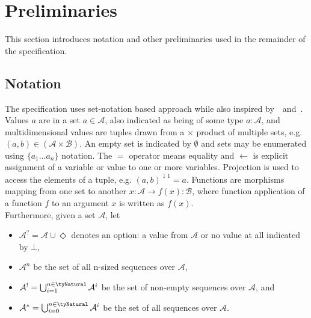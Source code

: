 \clearpage
\section{Preliminaries}\label{sec:prel}

This section introduces notation and other preliminaries used in the remainder
of the specification.

\subsection{Notation}

The specification uses set-notation based approach while also inspired
by~\cite{eutxo-2}~and~\cite{eutxo}. Values $a$ are in a set $a \in \mathcal{A}$,
also indicated as being of some type $a : \mathcal{A}$, and multidimensional values are
tuples drawn from a $\times$ product of multiple sets, e.g.
$(a,b) \in (\mathcal{A} \times \mathcal{B})$. An empty set is indicated by
$\emptyset$ and sets may be enumerated using $\{a_1 \dots a_n\}$ notation. The $=$ operator means
equality and $\gets$ is explicit assignment of a variable or value to one
or more variables. Projection is used to access the elements of a tuple, e.g.
${(a,b)}^{\downarrow1} = a$. Functions are morphisms mapping from one set to another
$x : \mathcal{A} \to f(x) : \mathcal{B}$, where function
application of a function $f$ to an argument $x$ is written as $f(x)$. \\

\noindent Furthermore, given a set $\mathcal{A}$, let
\begin{itemize}
	\item $\mathcal{A}^? = \mathcal{A} \cup \Diamond$ denotes an option: a value from $\mathcal{A}$ or no value at all indicated by $\bot$,
	\item $\mathcal{A}^n$ be the set of all n-sized sequences over $\mathcal{A}$,
	\item $\mathcal{A}^! = \bigcup_{i=1}^{n \in \tyNatural} \mathcal{A}^{i}$ be the set of non-empty sequences over $\mathcal{A}$, and
	\item $\mathcal{A}^* = \bigcup_{i=0}^{n \in \tyNatural} \mathcal{A}^{i}$ be
	      the set of all sequences over $\mathcal{A}$.
\end{itemize}

